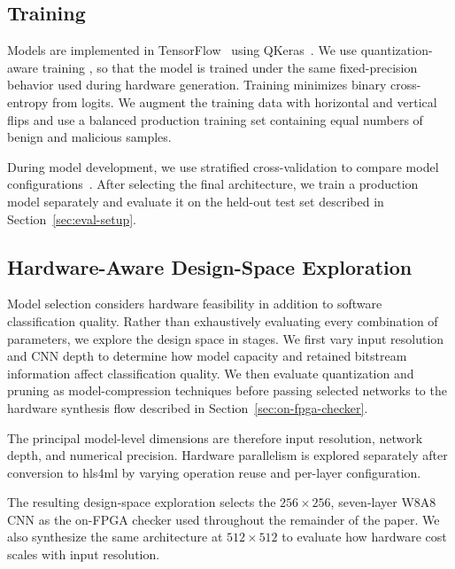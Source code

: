 \subsection{Training}
\label{sec:cnn-training}

Models are implemented in TensorFlow~\cite{abadi2016tensorflow} using
QKeras~\cite{coelho2020automatic}. We use quantization-aware training
\cite{coelho2020automatic}, so that the model is trained under the same
fixed-precision behavior used during hardware generation. Training minimizes
binary cross-entropy from logits. We augment the training data with horizontal
and vertical flips and use a balanced production training set containing equal
numbers of benign and malicious samples.

During model development, we use stratified cross-validation to compare model
configurations~\cite{kohavi1995study}. After selecting the final architecture, we train a production
model separately and evaluate it on the held-out test set described in
Section~\ref{sec:eval-setup}.

\subsection{Hardware-Aware Design-Space Exploration}
\label{sec:cnn-design-space}

Model selection considers hardware feasibility in addition to software
classification quality. Rather than exhaustively evaluating every combination
of parameters, we explore the design space in stages. We first vary input
resolution and CNN depth to determine how model capacity and retained bitstream
information affect classification quality. We then evaluate quantization and
pruning as model-compression techniques before passing selected networks to the
hardware synthesis flow described in Section~\ref{sec:on-fpga-checker}.

The principal model-level dimensions are therefore input resolution, network
depth, and numerical precision. Hardware parallelism is explored separately
after conversion to hls4ml by varying operation reuse and per-layer
configuration.

The resulting design-space exploration selects the $256\times256$, seven-layer
W8A8 CNN as the on-FPGA checker used throughout the remainder of the paper.
We also synthesize the same architecture at $512\times512$ to evaluate how
hardware cost scales with input resolution.